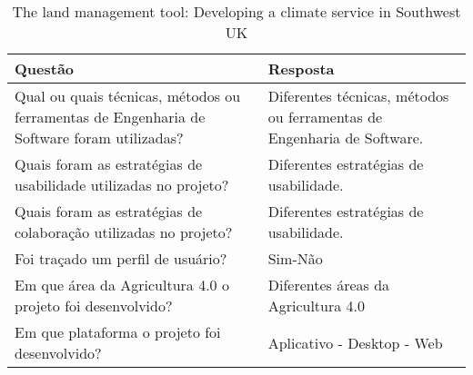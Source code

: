 \documentclass[12pt]{article}
\begin{document}
\begin{table}[!htb]
	\footnotesize
  \centering
	\begin{tabular}{|p{8cm}|p{6cm}|}
		\hline
		\textbf{Questão}                                                                           & \textbf{Resposta}                                                      \\ \hline
		Qual ou quais técnicas, métodos ou ferramentas de Engenharia de Software foram utilizadas? & Diferentes técnicas, métodos ou ferramentas de Engenharia de Software. \\ \hline
		Quais foram as estratégias de usabilidade utilizadas no projeto?                           & Diferentes estratégias de usabilidade.                                 \\ \hline
		Quais foram as estratégias de colaboração utilizadas no projeto?                           & Diferentes estratégias de usabilidade.                                 \\ \hline
		Foi traçado um perfil de usuário?                                                          & Sim-Não                                                                \\ \hline
		Em que área da Agricultura 4.0 o projeto foi desenvolvido?                                 & Diferentes áreas da Agricultura 4.0                                    \\ \hline
		Em que plataforma o projeto foi desenvolvido?                                              & Aplicativo - Desktop - Web                                 \\ \hline
		\end{tabular}
  \caption{The land management tool: Developing a climate service in Southwest UK}
  \label{tab:extracao5}
\end{table}

% 
% 
\end{document}
